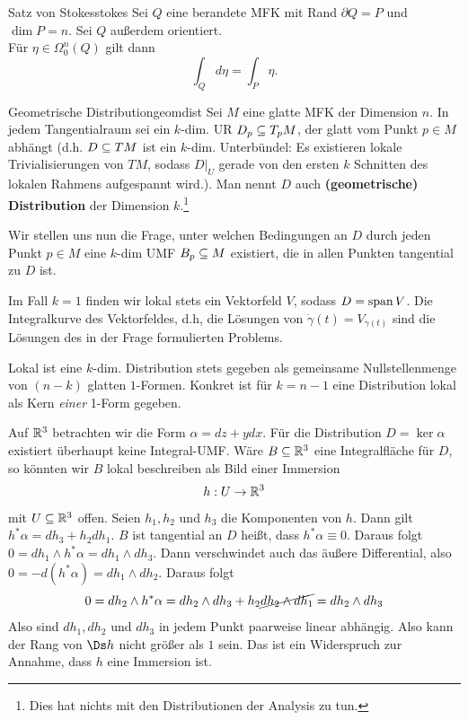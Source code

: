\begin{theorem}{Satz von Stokes}{stokes}
Sei $Q$ eine berandete MFK mit Rand $\partial Q = P$ und $\dim P = n$. Sei $Q$ außerdem orientiert.\\
Für $\eta \in \Omega_0^n (Q)$ gilt dann
\begin{equation}
\int_Q d \eta = \int_P \eta.
\end{equation}
\end{theorem}


\begin{definition}{Geometrische Distribution}{geomdist}
Sei $M$ eine glatte MFK der Dimension $n$. In jedem Tangentialraum sei ein $k$-dim. UR $D_p \subseteq T_p M$, der glatt vom Punkt $p \in M$ abhängt (d.h. $D \subseteq TM$ ist ein $k$-dim. Unterbündel: Es existieren lokale Trivialisierungen von $TM$, sodass $D|_U$ gerade von den ersten $k$ Schnitten des lokalen Rahmens aufgespannt wird.). Man nennt $D$ auch \textbf{(geometrische) Distribution} der Dimension $k$.\footnote{Dies hat nichts mit den Distributionen der Analysis zu tun.}
\end{definition}
Wir stellen uns nun die Frage, unter welchen Bedingungen an $D$ durch jeden Punkt $p \in M$ eine $k$-dim UMF $B_p \subseteq M$ existiert, die in allen Punkten tangential zu $D$ ist.
\begin{beispiel}
Im Fall $k=1$ finden wir lokal stets ein Vektorfeld $V$, sodass $D = \spn V$. Die Integralkurve des Vektorfeldes, d.h, die Lösungen von $\dot{\gamma}(t) = V_{\gamma (t)}$ sind die Lösungen des in der Frage formulierten Problems.
\end{beispiel}
\begin{bemerkung}
Lokal ist eine $k$-dim. Distribution stets gegeben als gemeinsame Nullstellenmenge von $(n-k)$ glatten $1$-Formen. Konkret ist für $k=n-1$ eine Distribution lokal als Kern \textit{einer} 1-Form gegeben.
\end{bemerkung}
\begin{beispiel}
Auf $\mathbb{R}^3$ betrachten wir die Form $\alpha = dz +y dx$. Für die Distribution $D = \ker \alpha$ existiert überhaupt keine Integral-UMF. Wäre $B \subseteq \mathbb{R}^3$ eine Integralfläche für $D$, so könnten wir $B$ lokal beschreiben als Bild einer Immersion
\begin{equation}
h: U \to \mathbb{R}^3
\end{equation}
mit $U \subseteq \mathbb{R}^3$ offen. Seien $h_1, h_2$ und $h_3$ die Komponenten von $h$. Dann gilt $h^\ast \alpha = dh_3 + h_2 dh_1$. $B$ ist tangential an $D$ heißt, dass $h^\ast \alpha \equiv 0$. Daraus folgt $0 = dh_1 \wedge h^\ast \alpha = dh_1 \wedge dh_3$. Dann verschwindet auch das äußere Differential, also $0 = - d(h^\ast \alpha) = dh_1 \wedge dh_2$. Daraus folgt 
\begin{equation}
0 = dh_2 \wedge h^\ast \alpha = dh_2 \wedge dh_3 + h_2 \cancel{dh_2 \wedge dh_1} = dh_2 \wedge dh_3
\end{equation}
Also sind $dh_1, dh_2$ und $dh_3$ in jedem Punkt paarweise linear abhängig. Also kann der Rang von $\Ds h$ nicht größer als $1$ sein. Das ist ein Widerspruch zur Annahme, dass $h$ eine Immersion ist.
\end{beispiel}
